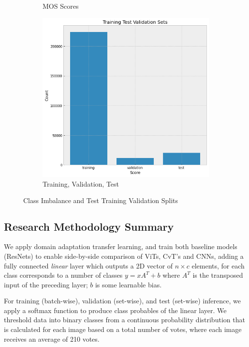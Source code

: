 \begin{figure}[ht]
\begin{subfigure}[b]{0.25\textwidth}
    \caption{MOS Scores}
    \end{subfigure}
    \hspace{5mm}
    \begin{subfigure}[b]{0.25\textwidth}
    \includegraphics[height=\textwidth]{figures/research_methadology/test trian validation.png}
    \caption{Training, Validation, Test}
    \label{fig:test train}
    \end{subfigure}
    \caption{Class Imbalance and Test Training Validation Splits}
    \label{fig:class imballance}
    \end{figure}

\subsection{Research Methodology Summary}


We apply domain adaptation transfer learning, and train both baseline models (ResNets) to enable side-by-side comparison of ViTs, CvT's and CNNs, adding a fully connected \textit{linear} layer which outputs a 2D vector of $n \times c$ elements, for each class corresponds to a number of classes $y = xA^T +b $ where $A^T$ is the transposed input of the preceding layer; $b$ is some learnable bias. 

For training (batch-wise), validation (set-wise), and test (set-wise) inference, we apply a softmax function to produce class probables of the linear layer. We threshold data into binary classes from a continuous probability distribution that is calculated for each image based on a total number of votes, where each image receives an average of 210 votes. 


